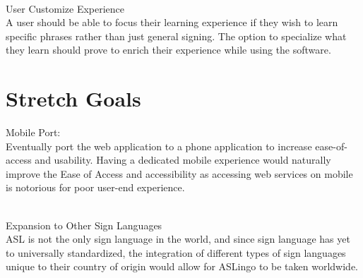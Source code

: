 \documentclass{article}
\begin{document}
~\\User Customize Experience\\
A user should be able to focus their learning experience if they wish to learn specific phrases rather than just general signing. The option to specialize what they learn should prove to enrich their experience while using the software.

\section{Stretch Goals}

Mobile Port:\\
Eventually port the web application to a phone application to increase ease-of-access and usability. Having a dedicated mobile experience would naturally improve the Ease of Access and accessibility as accessing web services on mobile is notorious for poor user-end experience.

~\\Expansion to Other Sign Languages\\
ASL is not the only sign language in the world, and since sign language has yet to universally standardized, the integration of different types of sign languages unique to their country of origin would allow for ASLingo to be taken worldwide.
\end{document}
